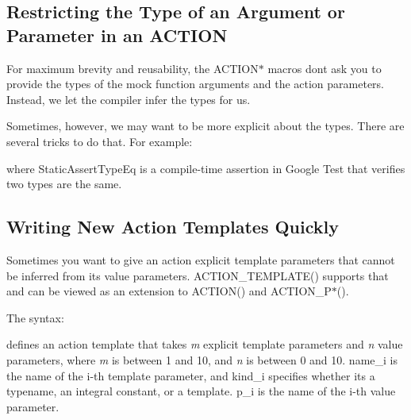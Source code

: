 \subsection*{Restricting the Type of an Argument or Parameter in an A\+C\+T\+I\+ON}

For maximum brevity and reusability, the {\ttfamily A\+C\+T\+I\+O\+N$\ast$} macros don\textquotesingle{}t ask you to provide the types of the mock function arguments and the action parameters. Instead, we let the compiler infer the types for us.

Sometimes, however, we may want to be more explicit about the types. There are several tricks to do that. For example\+: 
\begin{DoxyCode}{0}
\DoxyCodeLine{\}}
\DoxyCodeLine{}
\DoxyCodeLine{}
\DoxyCodeLine{\}}
\end{DoxyCode}
 where {\ttfamily Static\+Assert\+Type\+Eq} is a compile-\/time assertion in Google Test that verifies two types are the same.

\subsection*{Writing New Action Templates Quickly}

Sometimes you want to give an action explicit template parameters that cannot be inferred from its value parameters. {\ttfamily A\+C\+T\+I\+O\+N\+\_\+\+T\+E\+M\+P\+L\+A\+T\+E()} supports that and can be viewed as an extension to {\ttfamily A\+C\+T\+I\+O\+N()} and {\ttfamily A\+C\+T\+I\+O\+N\+\_\+\+P$\ast$()}.

The syntax\+: 
\begin{DoxyCode}{0}
\end{DoxyCode}


defines an action template that takes {\itshape m} explicit template parameters and {\itshape n} value parameters, where {\itshape m} is between 1 and 10, and {\itshape n} is between 0 and 10. {\ttfamily name\+\_\+i} is the name of the i-\/th template parameter, and {\ttfamily kind\+\_\+i} specifies whether it\textquotesingle{}s a {\ttfamily typename}, an integral constant, or a template. {\ttfamily p\+\_\+i} is the name of the i-\/th value parameter.

